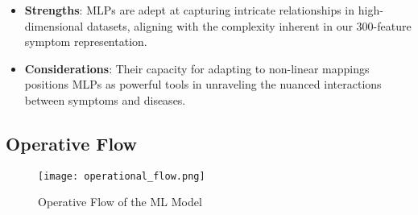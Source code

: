 \begin{itemize}
	\item \textbf{Strengths}: MLPs are adept at capturing intricate relationships in high-dimensional datasets,
	      aligning with the complexity inherent in our 300-feature symptom representation.
	\item \textbf{Considerations}: Their capacity for adapting to non-linear mappings positions MLPs as powerful
	      tools in unraveling the nuanced interactions between symptoms and diseases.
\end{itemize}




\subsection{Operative Flow}

\begin{figure}[t]
	\centering
	\texttt{[image: operational\_flow.png]}
	\caption{Operative Flow of the ML Model}\label{fig:ML_operative_flow}
\end{figure}

